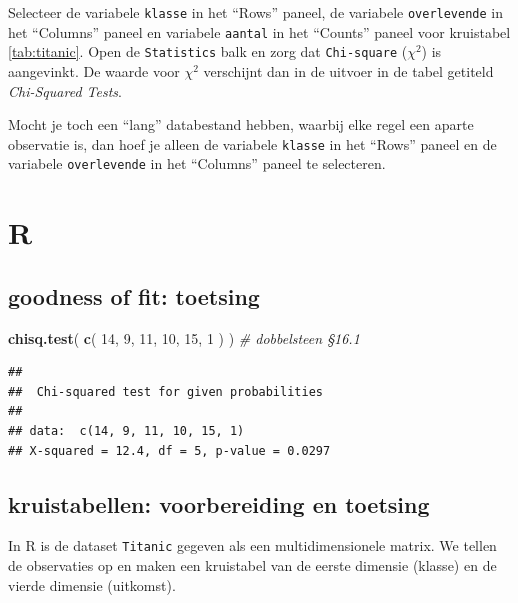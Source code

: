 \documentclass[
]{book}
\newenvironment{Shaded}{\begin{snugshade}}{\end{snugshade}}
\newcommand{\CommentTok}[1]{\textcolor[rgb]{0.56,0.35,0.01}{\textit{#1}}}
\newcommand{\DecValTok}[1]{\textcolor[rgb]{0.00,0.00,0.81}{#1}}
\newcommand{\KeywordTok}[1]{\textcolor[rgb]{0.13,0.29,0.53}{\textbf{#1}}}
\newcommand{\NormalTok}[1]{#1}
\begin{document}
Selecteer de variabele \texttt{klasse} in het ``Rows'' paneel, de variabele \texttt{overlevende} in het ``Columns'' paneel en variabele \texttt{aantal} in het ``Counts'' paneel voor kruistabel \ref{tab:titanic}. Open de \texttt{Statistics} balk
en zorg dat \texttt{Chi-square} (\(\chi^2\)) is aangevinkt. De waarde voor \(\chi^2\) verschijnt dan in de uitvoer in de tabel getiteld \emph{Chi-Squared Tests}.

Mocht je toch een ``lang'' databestand hebben, waarbij elke regel een aparte observatie is, dan hoef je alleen de variabele \texttt{klasse} in het ``Rows'' paneel en de variabele \texttt{overlevende} in het ``Columns'' paneel te selecteren.

\hypertarget{r-17}{%
\section{R}\label{r-17}}

\hypertarget{goodness-of-fit-toetsing-2}{%
\subsection{goodness of fit: toetsing}\label{goodness-of-fit-toetsing-2}}

\begin{Shaded}
\begin{Highlighting}[]
\KeywordTok{chisq.test}\NormalTok{( }\KeywordTok{c}\NormalTok{( }\DecValTok{14}\NormalTok{, }\DecValTok{9}\NormalTok{, }\DecValTok{11}\NormalTok{, }\DecValTok{10}\NormalTok{, }\DecValTok{15}\NormalTok{, }\DecValTok{1}\NormalTok{ ) ) }\CommentTok{\# dobbelsteen §16.1}
\end{Highlighting}
\end{Shaded}

\begin{verbatim}
## 
##  Chi-squared test for given probabilities
## 
## data:  c(14, 9, 11, 10, 15, 1)
## X-squared = 12.4, df = 5, p-value = 0.0297
\end{verbatim}

\hypertarget{kruistabellen-voorbereiding-en-toetsing}{%
\subsection{kruistabellen: voorbereiding en toetsing}\label{kruistabellen-voorbereiding-en-toetsing}}

In R is de dataset \texttt{Titanic} gegeven als een multidimensionele matrix. We tellen de observaties op en maken een kruistabel van de eerste dimensie (klasse) en de vierde dimensie (uitkomst).
\end{document}
